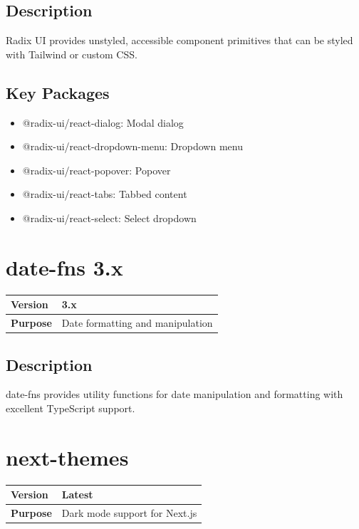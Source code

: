 \documentclass[12pt,a4paper]{report}
\begin{document}
\subsection{Description}

Radix UI provides unstyled, accessible component primitives that can be styled with Tailwind or custom CSS.

\subsection{Key Packages}

\begin{itemize}
    \item @radix-ui/react-dialog: Modal dialog
    \item @radix-ui/react-dropdown-menu: Dropdown menu
    \item @radix-ui/react-popover: Popover
    \item @radix-ui/react-tabs: Tabbed content
    \item @radix-ui/react-select: Select dropdown
\end{itemize}

\section{date-fns 3.x}

\begin{tabular}{|p{4cm}|p{10cm}|}
\hline
\textbf{Version} & 3.x \\
\hline
\textbf{Purpose} & Date formatting and manipulation \\
\hline
\end{tabular}

\subsection{Description}

date-fns provides utility functions for date manipulation and formatting with excellent TypeScript support.

\section{next-themes}

\begin{tabular}{|p{4cm}|p{10cm}|}
\hline
\textbf{Version} & Latest \\
\hline
\textbf{Purpose} & Dark mode support for Next.js \\
\hline
\end{tabular}
\end{document}
